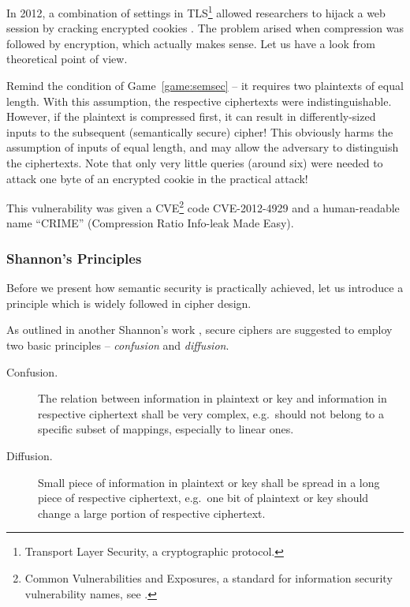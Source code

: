 \begin{example}
\label{ex:crime}
	In 2012, a combination of settings in TLS\footnote{Transport Layer Security, a cryptographic protocol.} allowed researchers to hijack a web session by cracking encrypted cookies \cite{goodin2012crime}. The problem arised when compression was followed by encryption, which actually makes sense. Let us have a look from theoretical point of view.
	
	Remind the condition of Game~\ref{game:semsec} -- it requires two plaintexts of equal length. With this assumption, the respective ciphertexts were indistinguishable. However, if the plaintext is compressed first, it can result in differently-sized inputs to the subsequent (semantically secure) cipher! This obviously harms the assumption of inputs of equal length, and may allow the adversary to distinguish the ciphertexts. Note that only very little queries (around six) were needed to attack one byte of an encrypted cookie in the practical attack!
	
	This vulnerability was given a CVE\footnote{Common Vulnerabilities and Exposures, a standard for information security vulnerability names, see .} code CVE-2012-4929 and a human-readable name ``CRIME'' (Compression Ratio Info-leak Made Easy).
\end{example}

\subsubsection{Shannon's Principles}
	
	Before we present how semantic security is practically achieved, let us introduce a principle which is widely followed in cipher design.
	
	\begin{princ}[Shannon]
	\label{pri:shannon}
		As outlined in another Shannon's work \cite{shannon1949communication}, secure ciphers are suggested to employ two basic principles -- {\em confusion} and {\em diffusion}.
		\begin{description}
			\item[Confusion.] The relation between information in plaintext or key and information in respective ciphertext shall be very complex, e.g.\ should not belong to a specific subset of mappings, especially to linear ones.
			\item[Diffusion.] Small piece of information in plaintext or key shall be spread in a long piece of respective ciphertext, e.g.\ one bit of plaintext or key should change a large portion of respective ciphertext.
		\end{description}
	\end{princ}
	

